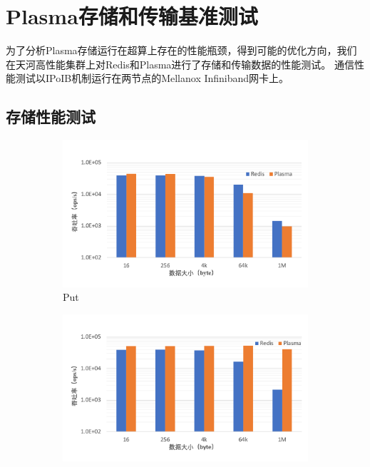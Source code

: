 \section{Plasma存储和传输基准测试}
\label{sec:bench}

为了分析Plasma存储运行在超算上存在的性能瓶颈，得到可能的优化方向，我们在天河高性能集群上对Redis和Plasma进行了存储和传输数据的性能测试。
通信性能测试以IPoIB机制运行在两节点的Mellanox Infiniband网卡上。

\subsection{存储性能测试}

\begin{figure}[h]
    \begin{subfigure}{0.49\textwidth}
        \includegraphics[width=\textwidth]{image/chap02/set.png}
        \caption{Put}
    \end{subfigure}
    \begin{subfigure}{0.49\textwidth}
        \includegraphics[width=\textwidth]{image/chap02/get.png}

\end{subfigure}
\end{figure}
